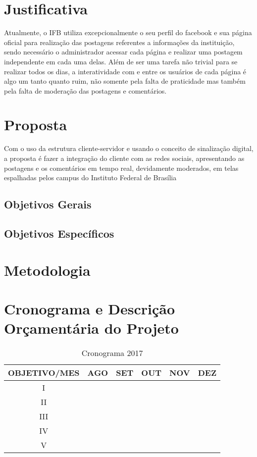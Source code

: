 \documentclass[
	12pt,				%
	openright,			%
	oneside,			%
	a4paper,			%
	english,			%
	french,				%
	spanish,			%
	brazil,				%
	]{abntex2}
\begin{document}
\section*{Justificativa}
	Atualmente, o IFB utiliza excepcionalmente o seu perfil do facebook e sua página oficial para realização das postagens referentes a informações da instituição, sendo necessário o administrador acessar cada página e realizar uma postagem independente em cada uma delas. Além de ser uma tarefa não trivial para se realizar todos os dias, a interatividade com e entre os usuários de cada página é algo um tanto quanto ruim, não somente pela falta de praticidade mas também pela falta de moderação das postagens e comentários.
	
\section*{Proposta}
	Com o uso da estrutura cliente-servidor e usando o conceito de sinalização digital, a proposta é fazer a integração do cliente com as redes sociais, apresentando as postagens e os comentários em tempo real, devidamente moderados, em telas espalhadas pelos campus do Instituto Federal de Brasília
	
\subsection*{Objetivos Gerais}

\subsection*{Objetivos Específicos}

\section*{Metodologia}

\section*{Cronograma e Descrição Orçamentária do Projeto}
	\begin{table}[h!]
		\centering
		\caption{Cronograma 2017}
		\label{my-label}
		\begin{tabular}{|c|c|c|c|c|c|}
			\hline
			OBJETIVO/MES & AGO & SET & OUT & NOV & DEZ \\ \hline
			I &  & & & & \\ \hline
			II &  & & & & \\ \hline
			III &  & & & & \\ \hline
			IV &  & & & & \\ \hline
			V &  & & & & \\ \hline
		\end{tabular}
	\end{table}
\end{document}
